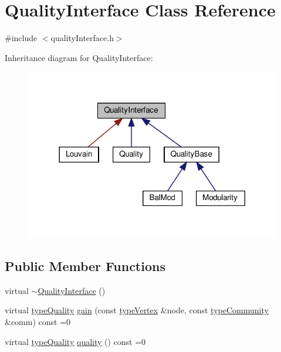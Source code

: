 \hypertarget{classQualityInterface}{}\section{Quality\+Interface Class Reference}
\label{classQualityInterface}


{\ttfamily \#include $<$quality\+Interface.\+h$>$}



Inheritance diagram for Quality\+Interface\+:
\nopagebreak
\begin{figure}[H]
\begin{center}
\leavevmode
\includegraphics[width=317pt]{classQualityInterface__inherit__graph}
\end{center}
\end{figure}
\subsection*{Public Member Functions}
\begin{DoxyCompactItemize}
\item 
virtual \hyperlink{classQualityInterface_abe41a70c92a0b72dd9ff2a77fc9fdace}{$\sim$\+Quality\+Interface} ()
\item 
virtual \hyperlink{qualityInterface_8h_a15a3ec6041e6e02d00d2eff22c20fd94}{type\+Quality} \hyperlink{classQualityInterface_ab6a2e15d118c3945243abb96c7cc0360}{gain} (const \hyperlink{edge_8h_a5fbd20c46956d479cb10afc9855223f6}{type\+Vertex} \&node, const \hyperlink{graphUndirectedGroupable_8h_a914da95c9ea7f14f4b7f875c36818556}{type\+Community} \&comm) const =0
\item 
virtual \hyperlink{qualityInterface_8h_a15a3ec6041e6e02d00d2eff22c20fd94}{type\+Quality} \hyperlink{classQualityInterface_a1c40b3e5e51d8ed2a4390b3cb0164f0a}{quality} () const =0
\end{DoxyCompactItemize}


